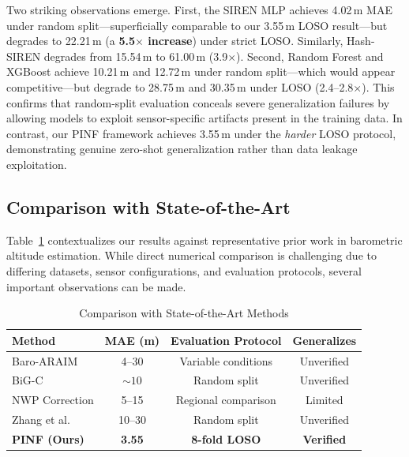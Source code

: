 Two striking observations emerge. First, the SIREN MLP achieves 4.02\,m MAE under random split---superficially comparable to our 3.55\,m LOSO result---but degrades to 22.21\,m (a \textbf{5.5$\times$ increase}) under strict LOSO. Similarly, Hash-SIREN degrades from 15.54\,m to 61.00\,m (3.9$\times$). Second, Random Forest and XGBoost achieve 10.21\,m and 12.72\,m under random split---which would appear competitive---but degrade to 28.75\,m and 30.35\,m under LOSO (2.4--2.8$\times$). This confirms that random-split evaluation conceals severe generalization failures by allowing models to exploit sensor-specific artifacts present in the training data. In contrast, our PINF framework achieves 3.55\,m under the \emph{harder} LOSO protocol, demonstrating genuine zero-shot generalization rather than data leakage exploitation.


\subsection{Comparison with State-of-the-Art}
\label{subsec:sota_comparison}

Table~\ref{tab:sota_comparison} contextualizes our results against representative prior work in barometric altitude estimation. While direct numerical comparison is challenging due to differing datasets, sensor configurations, and evaluation protocols, several important observations can be made.

\begin{table}[htbp]
\caption{Comparison with State-of-the-Art Methods}
\label{tab:sota_comparison}
\centering
\begin{tabular}{lccc}
\toprule
\textbf{Method} & \textbf{MAE (m)} & \textbf{Evaluation Protocol} & \textbf{Generalizes} \\
\midrule
Baro-ARAIM \cite{simonetti2024geodetic} & 4--30 & Variable conditions & Unverified \\
BiG-C \cite{narayanan2022enhanced} & ${\sim}10$ & Random split & Unverified \\
NWP Correction \cite{schumann2017use} & 5--15 & Regional comparison & Limited \\
Zhang et al. \cite{zhang2020urban} & 10--30 & Random split & Unverified \\
\midrule
\textbf{PINF (Ours)} & \textbf{3.55} & \textbf{8-fold LOSO} & \textbf{Verified} \\
\bottomrule
\end{tabular}
\end{table}

